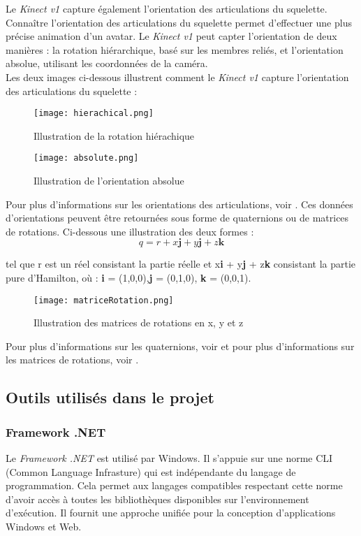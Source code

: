 Le \textit{Kinect v1} capture également l'orientation des articulations du squelette. Connaître l'orientation des articulations du squelette permet d'effectuer une plus précise animation d'un avatar. Le \textit{Kinect v1} peut capter l'orientation de deux manières : la rotation hiérarchique, basé sur les membres reliés, et l'orientation absolue, utilisant les coordonnées de la caméra. \\

Les deux images ci-dessous illustrent comment le \textit{Kinect v1} capture l'orientation des articulations du squelette :
\begin{figure}[H]
\centering
\texttt{[image: hierachical.png]}
\caption{\label{hierachical} Illustration de la rotation hiérachique}
\texttt{[image: absolute.png]}
\caption{\label{absolute} Illustration de l'orientation absolue}
\end{figure}
Pour plus d'informations sur les orientations des articulations, voir \cite{jointOrientation}.
Ces données d'orientations peuvent être retournées sous forme de quaternions ou de matrices de rotations. Ci-dessous une illustration des deux formes : 
\begin{equation}
q = r + x\textbf{j}  + y\textbf{j} + z\textbf{k}
\end{equation}
\begin{center}
tel que r est un réel consistant la partie réelle  et x\textbf{i} + y\textbf{j} + z\textbf{k} consistant la partie pure d'Hamilton, où : \textbf{i} = (1,0,0),\textbf{j} = (0,1,0), \textbf{k} = (0,0,1).
\end{center}

\begin{figure}[H]
\centering
\texttt{[image: matriceRotation.png]}
\caption{\label{hierachical} Illustration des matrices de rotations en x, y et z}
\end{figure}

Pour plus d'informations sur les quaternions, voir \cite{quaternion} et pour plus d'informations sur les matrices de rotations, voir \cite{matrice}.


\subsection{Outils utilisés dans le projet}  \label{outilsUtilise}

\subsubsection{Framework .NET}
Le \textit{Framework .NET} est utilisé par Windows. Il s'appuie sur une norme CLI (Common Language Infrasture) qui est indépendante du langage de programmation. Cela permet aux langages compatibles respectant cette norme d'avoir accès à toutes les bibliothèques disponibles sur l'environnement d'exécution. Il fournit une approche unifiée pour la conception d'applications Windows et Web.

